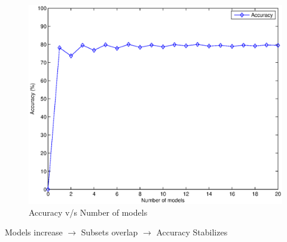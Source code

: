 \documentclass[xcolor=table]{beamer}
\begin{document}
\begin{frame}
\begin{columns}
\begin{column}{0.5\textwidth}
\begin{figure}
                    \centering
                    \includegraphics[width=\textwidth]{figures/bagging_n_models.eps}
                    \caption{\small Accuracy v/s Number of models}
                \end{figure}
                \begin{center}
                    \small Models increase $\rightarrow$ Subsets overlap $\rightarrow$ Accuracy Stabilizes
                \end{center}
            \end{column}
        \end{columns}
    \end{frame}
    
\end{document}

